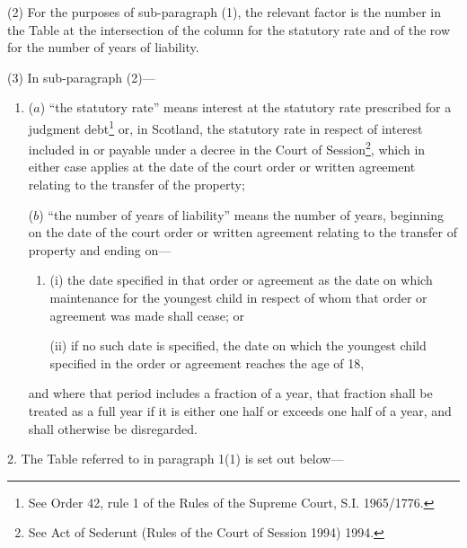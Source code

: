 \documentclass[12pt,a4paper]{article}
\begin{document}
(2) For the purposes of sub-paragraph (1), the relevant factor is the number in
the Table at the intersection of the column for the statutory rate and of the
row for the number of years of liability.

(3) In sub-paragraph (2)—
\begin{enumerate}\item[]
($a$) “the statutory rate” means interest at the statutory rate prescribed for a
judgment debt\footnote{\frenchspacing See Order 42, rule 1 of the Rules of the Supreme Court, S.I. 1965/1776.} or, in Scotland, the statutory rate in respect of interest
included in or payable under a decree in the Court of Session\footnote{\frenchspacing See Act of Sederunt (Rules of the Court of Session 1994) 1994.}, which in
either case applies at the date of the court order or written agreement relating
to the transfer of the property;

($b$) “the number of years of liability” means the number of years, beginning on
the date of the court order or written agreement relating to the transfer of
property and ending on—
\begin{enumerate}\item[]
(i) the date specified in that order or agreement as the date on which
maintenance for the youngest child in respect of whom that order or agreement
was made shall cease; or

(ii) if no such date is specified, the date on which the youngest child specified
in the order or agreement reaches the age of 18,
\end{enumerate}
and where that period includes a fraction of a year, that fraction shall be
treated as a full year if it is either one half or exceeds one half of a year,
and shall otherwise be disregarded.
\end{enumerate}

\medskip

2.  The Table referred to in paragraph 1(1) is set out below—

\end{document}
